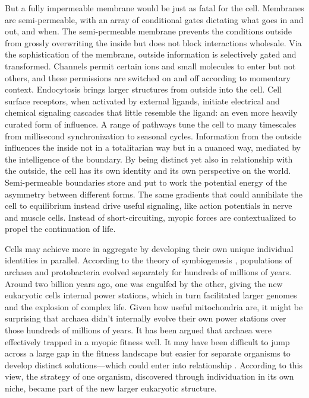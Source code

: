 \documentclass[12pt]{article}
\begin{document}
But a fully impermeable membrane would be just as fatal for the cell. Membranes are semi-permeable, with an array of conditional gates dictating what goes in and out, and when. The semi-permeable membrane prevents the conditions outside from grossly overwriting the inside but does not block interactions wholesale. Via the sophistication of the membrane, outside information is selectively gated and transformed. Channels permit certain ions and small molecules to enter but not others, and these permissions are switched on and off according to momentary context. Endocytosis brings larger structures from outside into the cell. Cell surface receptors, when activated by external ligands, initiate electrical and chemical signaling cascades that little resemble the ligand: an even more heavily curated form of influence. A range of pathways tune the cell to many timescales from millisecond synchronization to seasonal cycles. Information from the outside influences the inside not in a totalitarian way but in a nuanced way, mediated by the intelligence of the boundary. By being distinct yet also in relationship with the outside, the cell has its own identity and its own perspective on the world. Semi-permeable boundaries store and put to work the potential energy of the asymmetry between different forms. The same gradients that could annihilate the cell to equilibrium instead drive useful signaling, like action potentials in nerve and muscle cells. Instead of short-circuiting, myopic forces are contextualized to propel the continuation of life.






Cells may achieve more in aggregate by developing their own unique individual identities in parallel. According to the theory of symbiogenesis \citep{margulis1995what, margulis1986microcosmos, sapp1994evolution}, populations of archaea and protobacteria evolved separately for hundreds of millions of years. Around two billion years ago, one was engulfed by the other, giving the new eukaryotic cells internal power stations, which in turn facilitated larger genomes and the explosion of complex life. Given how useful mitochondria are, it might be surprising that archaea didn't internally evolve their own power stations over those hundreds of millions of years. It has been argued that archaea were effectively trapped in a myopic fitness well. It may have been difficult to jump across a large gap in the fitness landscape but easier for separate organisms to develop distinct solutions---which could enter into relationship \citep{lane2010energetics, smith1997major}. According to this view, the strategy of one organism, discovered through individuation in its own niche, became part of the new larger eukaryotic structure.
\end{document}
